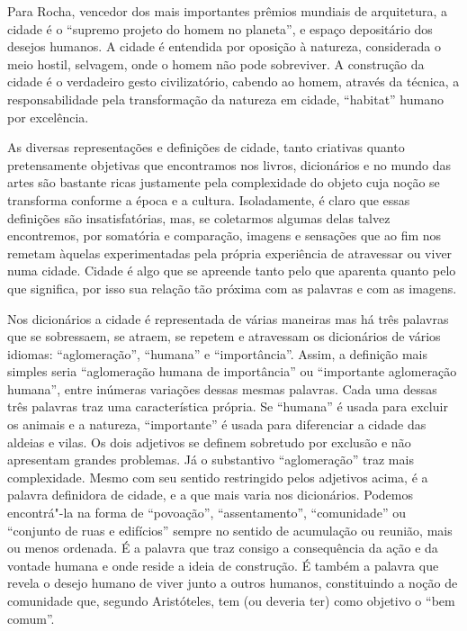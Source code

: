 Para Rocha, vencedor dos mais importantes prêmios mundiais de
arquitetura, a cidade é o ``supremo projeto do homem no planeta'', e
espaço depositário dos desejos humanos. A cidade é entendida por
oposição à natureza, considerada o meio hostil, selvagem, onde o homem
não pode sobreviver. A construção da cidade é o verdadeiro gesto
civilizatório, cabendo ao homem, através da técnica, a responsabilidade
pela transformação da natureza em cidade, ``habitat'' humano por
excelência.

As diversas representações e definições de cidade, tanto criativas
quanto pretensamente objetivas que encontramos nos livros, dicionários e
no mundo das artes são bastante ricas justamente pela complexidade do
objeto cuja noção se transforma conforme a época e a cultura.
Isoladamente, é claro que essas definições são insatisfatórias, mas, se
coletarmos algumas delas talvez encontremos, por somatória e comparação,
imagens e sensações que ao fim nos remetam àquelas experimentadas pela
própria experiência de atravessar ou viver numa cidade. Cidade é algo
que se apreende tanto pelo que aparenta quanto pelo que significa, por
isso sua relação tão próxima com as palavras e com as imagens.

Nos dicionários a cidade é representada de várias maneiras mas há três
palavras que se sobressaem, se atraem, se repetem e atravessam os
dicionários de vários idiomas: ``aglomeração'', ``humana'' e
``importância''. Assim, a definição mais simples seria ``aglomeração
humana de importância'' ou ``importante aglomeração humana'', entre
inúmeras variações dessas mesmas palavras. Cada uma dessas três palavras
traz uma característica própria. Se ``humana'' é usada para excluir os
animais e a natureza, ``importante'' é usada para diferenciar a cidade
das aldeias e vilas. Os dois adjetivos se definem sobretudo por exclusão
e não apresentam grandes problemas. Já o substantivo ``aglomeração''
traz mais complexidade. Mesmo com seu sentido restringido pelos
adjetivos acima, é a palavra definidora de cidade, e a que mais varia
nos dicionários. Podemos encontrá"-la na forma de ``povoação'',
``assentamento'', ``comunidade'' ou ``conjunto de ruas e edifícios''
sempre no sentido de acumulação ou reunião, mais ou menos ordenada. É a
palavra que traz consigo a consequência da ação e da vontade humana e
onde reside a ideia de construção. É também a palavra que revela o
desejo humano de viver junto a outros humanos, constituindo a noção de
comunidade que, segundo Aristóteles, tem (ou deveria ter) como objetivo
o ``bem comum''.

